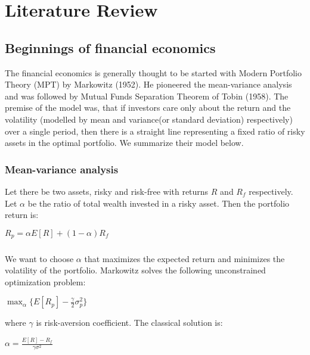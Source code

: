 \chapter{Literature Review}
\label{litreview}

\section{Beginnings of financial economics}

The financial economics is generally thought to be started with Modern Portfolio Theory (MPT) by Markowitz (1952). He pioneered the mean-variance analysis and was followed by Mutual Funds Separation Theorem of Tobin (1958). The premise of the model was, that if investors care only about the return and the volatility (modelled by mean and variance(or standard deviation) respectively) over a single period, then there is a straight line representing a fixed ratio of risky assets in the optimal portfolio. We summarize their model below.

\subsection{Mean-variance analysis}
Let there be two assets, risky and risk-free with returns $R$ and $R_f$ respectively. Let $\alpha$ be the ratio of total wealth invested in a risky asset. Then the portfolio return is:

\begin{center}
  $R_p = \alpha E[R] + (1-\alpha) R_f$
\end{center}

\paragraph{}We want to choose $\alpha$ that maximizes the expected return and minimizes the volatility of the portfolio. Markowitz solves the following unconstrained optimization problem:

\begin{center}
  $\displaystyle\max_{\alpha} \{ E[R_p] - \frac{\gamma}{2}\sigma^2_p \}$
\end{center}

where $\gamma$ is risk-aversion coefficient. The classical solution is:

\begin{center}
	$\alpha = \frac{E[R] - R_f}{\gamma\sigma^2}$
\end{center}

